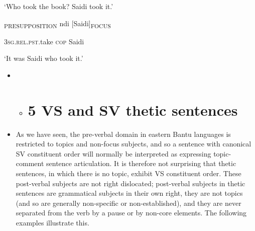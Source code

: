 \documentclass[output=paper]{langsci/langscibook}
\begin{document}
\begin{styleLangSciTranslation}
\begin{styleLangSciTranslation}
\begin{styleLangSciTranslation}
\glt \textup{‘}\textup{Who took the book? Saidi took it.’}
\z

\gll [Atwarire]\textsubscript{PRESUPPOSITION} ndi [Saidi]\textsubscript{FOCUS}\\
\begin{styleUntitledi}
\textsc{3sg.rel.pst}.take \textsc{cop }Saidi
\end{styleUntitledi}

\glt \textup{‘}\textup{It was Saidi who took it.’}
\z

\begin{itemize}
\item \begin{itemize}
\item \chapter{5  VS and SV thetic sentences}\end{itemize}
\item As we have seen, the pre-verbal domain in eastern Bantu languages is restricted to topics and non-focus subjects, and so a sentence with canonical SV constituent order will normally be interpreted as expressing topic-comment sentence articulation. It is therefore not surprising that thetic sentences, in which there is no topic, exhibit VS constituent order. These post-verbal subjects are not right dislocated; post-verbal subjects in thetic sentences are grammatical subjects in their own right, they are not topics (and so are generally non-specific or non-established), and they are never separated from the verb by a pause or by non-core elements. The following examples illustrate this.
\end{itemize}
\ea\label{ex:}
\\
\end{styleLangSciTranslation}
\end{styleLangSciTranslation}
\end{document}
